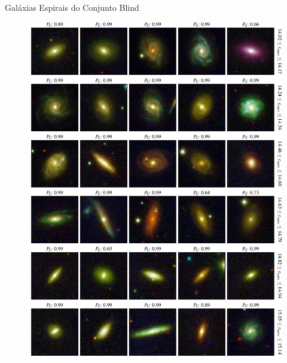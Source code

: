 \documentclass[10pt,xcolor=svgnames]{beamer}
\begin{document}
\begin{frame}{Galáxias Espirais do Conjunto Blind}
  \begin{minipage}{0.49\textwidth}
    \begin{figure}
      \includegraphics[width=\linewidth]{figures/blind_preds_spir_1.pdf}
    \end{figure}
  \end{minipage}\hfill
  \begin{minipage}{0.49\textwidth}
    \begin{figure}

\end{figure}
\end{minipage}
\end{frame}
\end{document}
